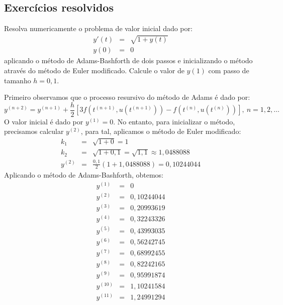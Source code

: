 \subsection*{Exercícios resolvidos}
\begin{exeresol}\label{exeresol:Adams_Bashforth:prob1} Resolva numericamente o problema de valor inicial dado por:
\begin{eqnarray}
 y'(t)&=& \sqrt{1+y(t)}\\
 y(0)&=& 0
\end{eqnarray}
aplicando o método de Adams-Bashforth de dois passos e inicializando o método através do método de Euler modificado. Calcule o valor de $y(1)$ com passo de tamanho $h=0,1$.
\end{exeresol}
\begin{resol}
Primeiro observamos que o processo resursivo do método de Adams é dado por:
\begin{equation}
  y^{(n+2)}=y^{(n+1)}+\frac{h}{2}\left[3f\left(t^{(n+1)},u(t^{(n+1)})\right)-f\left(t^{(n)},u(t^{(n)})\right)\right],~n=1,2,\ldots
 \end{equation}
O valor inicial é dado por $y^{(1)}=0$. No entanto, para inicializar o método, precisamos calcular $y^{(2)}$, para tal, aplicamos o método de Euler modificado:
\begin{eqnarray}
 k_1&=&\sqrt{1+0}=1\\
 k_2&=&\sqrt{1+0,1}=\sqrt{1,1}\approx 1,0488088 \\
 y^{(2)}&=& \frac{0,1}{2}\left(1+1,0488088 \right)=0,10244044
  \end{eqnarray}
Aplicando o método de Adams-Bashforth, obtemos:
  \begin{eqnarray}
 y^{(1)}&=&0\\
 y^{(2)}&=&0,10244044\\
 y^{(3)}&=&0,20993619\\
 y^{(4)}&=&0,32243326\\
 y^{(5)}&=&0,43993035\\
 y^{(6)}&=&0,56242745\\
 y^{(7)}&=&0,68992455\\
 y^{(8)}&=&0,82242165\\
 y^{(9)}&=&0,95991874\\
 y^{(10)}&=&1,10241584\\
 y^{(11)}&=&1,24991294
  \end{eqnarray}
\end{resol}

